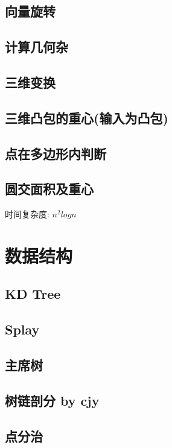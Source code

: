 \documentclass[landscape,a4paper]{article}
\begin{document}
\begin{spacing}{0.3}
\begin{multicols}{3}
	
	\subsection{向量旋转}
		
		\subsection{计算几何杂}
		
		\subsection{三维变换}
		
	\subsection{三维凸包的重心(输入为凸包)}
		
	\subsection{点在多边形内判断}
		
	\subsection{圆交面积及重心}
		时间复杂度: $n^2logn$
		
	
		
	\section{数据结构}
		\subsection{KD Tree}
		
		\subsection{Splay}
		
		\subsection{主席树}
		
		\subsection{树链剖分 by cjy}
		
		\subsection{点分治}
		

\end{multicols}
\end{spacing}
\end{document}

